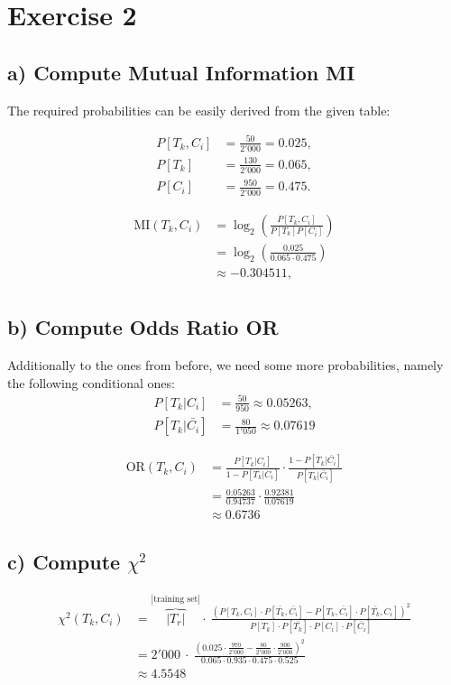 \documentclass[a4paper]{article}
\newcommand{\mi}{\text{MI}}
\newcommand{\oddr}{\text{OR}}
\begin{document}
\section*{Exercise 2}
\subsection*{a) Compute Mutual Information MI}
The required probabilities can be easily derived from the given table:

\begin{align*}
 P[T_k, C_i] &= \frac{50}{2'000} = 0.025, \\
 P[T_k] &= \frac{130}{2'000} = 0.065, \\
 P[C_i] &= \frac{950}{2'000} = 0.475.
\end{align*}

\begin{align*}
\mi(T_k, C_i) &= \log_2 \left( \frac{P[T_k,C_i]}{P[T_k] P[C_i]}\right) \\ 
&= \log_2 \left(\frac{0.025}{ 0.065 \cdot  0.475}\right) \\
&\approx -0.304511, \\
\end{align*}

\subsection*{b) Compute Odds Ratio OR}
Additionally to the ones from before, we need some more probabilities, namely the following conditional ones:
\begin{align*}
P[T_k \vert C_i] &= \frac{50}{950} \approx 0.05263, \\
P[T_k \vert \bar{C_i}] &= \frac{80}{1'050} \approx  0.07619
\end{align*}

\begin{align*}
 \oddr(T_k,C_i) &= \frac{P[T_k \vert C_i]}{1 - P[T_k \vert C_i]} \cdot \frac{1 - P[T_k \vert \bar{C_i}]}{P[T_k \vert \bar{C_i}]} \\
 &= \frac{0.05263}{0.94737} \cdot \frac{0.92381}{0.07619} \\
 &\approx 0.6736
\end{align*}

\subsection*{c) Compute $\chi^2$}
\begin{align*}
 \chi^2(T_k,C_i) &= \overbrace{|T_r|}^{|\text{training set}|} \cdot ~ \frac{\left( P[T_k,C_i] \cdot P[\bar{T_k}, \bar{C_i}] - P[T_k,\bar{C_i}] \cdot P[\bar{T_k},C_i]\right)^2}{P[T_k] \cdot P[\bar{T_k}] \cdot P[C_i] \cdot P[\bar{C_i}]} \\
&= 2'000 ~ \cdot ~ \frac{\left( 0.025 \cdot \frac{970}{2'000} - \frac{80}{2'000} \cdot \frac{900}{2'000} \right)^2}{0.065 \cdot 0.935 \cdot 0.475 \cdot 0.525} \\
&\approx 4.5548
\end{align*}
\end{document}
